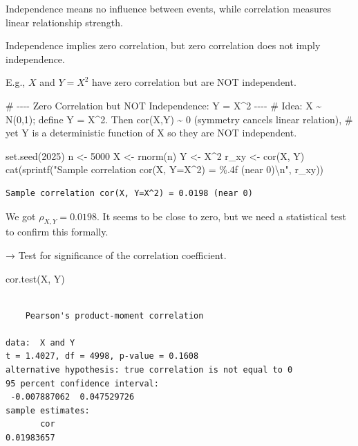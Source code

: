\documentclass[
  12pt,
  letterpaper,
]{scrbook}
\newenvironment{Shaded}{\begin{snugshade}}{\end{snugshade}}
\newcommand{\CommentTok}[1]{\textcolor[rgb]{0.37,0.37,0.37}{#1}}
\newcommand{\DecValTok}[1]{\textcolor[rgb]{0.68,0.00,0.00}{#1}}
\newcommand{\FunctionTok}[1]{\textcolor[rgb]{0.28,0.35,0.67}{#1}}
\newcommand{\NormalTok}[1]{\textcolor[rgb]{0.00,0.23,0.31}{#1}}
\newcommand{\OtherTok}[1]{\textcolor[rgb]{0.00,0.23,0.31}{#1}}
\newcommand{\SpecialCharTok}[1]{\textcolor[rgb]{0.37,0.37,0.37}{#1}}
\newcommand{\StringTok}[1]{\textcolor[rgb]{0.13,0.47,0.30}{#1}}
\theoremstyle{plain}
\theoremstyle{definition}
\theoremstyle{remark}
\begin{document}
Independence means no influence between events, while correlation
measures linear relationship strength.

Independence implies zero correlation, but zero correlation does not
imply independence.

E.g., \(X\) and \(Y = X^2\) have zero correlation but are NOT
independent.

\begin{Shaded}
\begin{Highlighting}[]
\CommentTok{\# {-}{-}{-}{-} Zero Correlation but NOT Independence: Y = X\^{}2 {-}{-}{-}{-}}
\CommentTok{\# Idea: X \textasciitilde{} N(0,1); define Y = X\^{}2. Then cor(X,Y) \textasciitilde{} 0 (symmetry cancels linear relation),}
\CommentTok{\# yet Y is a deterministic function of X so they are NOT independent.}

\FunctionTok{set.seed}\NormalTok{(}\DecValTok{2025}\NormalTok{)}
\NormalTok{n }\OtherTok{\textless{}{-}} \DecValTok{5000}
\NormalTok{X }\OtherTok{\textless{}{-}} \FunctionTok{rnorm}\NormalTok{(n)}
\NormalTok{Y }\OtherTok{\textless{}{-}}\NormalTok{ X}\SpecialCharTok{\^{}}\DecValTok{2}
\NormalTok{r\_xy }\OtherTok{\textless{}{-}} \FunctionTok{cor}\NormalTok{(X, Y)}
\FunctionTok{cat}\NormalTok{(}\FunctionTok{sprintf}\NormalTok{(}\StringTok{"Sample correlation cor(X, Y=X\^{}2) = \%.4f (near 0)}\SpecialCharTok{\textbackslash{}n}\StringTok{"}\NormalTok{, r\_xy))}
\end{Highlighting}
\end{Shaded}

\begin{verbatim}
Sample correlation cor(X, Y=X^2) = 0.0198 (near 0)
\end{verbatim}

We got \(\rho_{X,Y}=0.0198\). It seems to be close to zero, but we need
a statistical test to confirm this formally.

→ Test for significance of the correlation coefficient.

\begin{Shaded}
\begin{Highlighting}[]
\FunctionTok{cor.test}\NormalTok{(X, Y)}
\end{Highlighting}
\end{Shaded}

\begin{verbatim}

    Pearson's product-moment correlation

data:  X and Y
t = 1.4027, df = 4998, p-value = 0.1608
alternative hypothesis: true correlation is not equal to 0
95 percent confidence interval:
 -0.007887062  0.047529726
sample estimates:
       cor 
0.01983657 
\end{verbatim}
\end{document}
